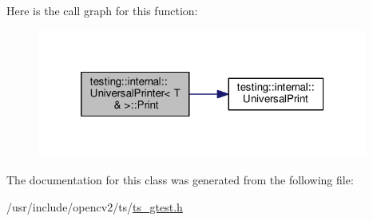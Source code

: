 Here is the call graph for this function\-:\nopagebreak
\begin{figure}[H]
\begin{center}
\leavevmode
\includegraphics[width=308pt]{classtesting_1_1internal_1_1UniversalPrinter_3_01T_01_6_01_4_a2a63ddb20294c4234b7e8f3c7a56355d_cgraph}
\end{center}
\end{figure}




The documentation for this class was generated from the following file\-:\begin{DoxyCompactItemize}
\item 
/usr/include/opencv2/ts/\hyperlink{ts__gtest_8h}{ts\-\_\-gtest.\-h}\end{DoxyCompactItemize}
